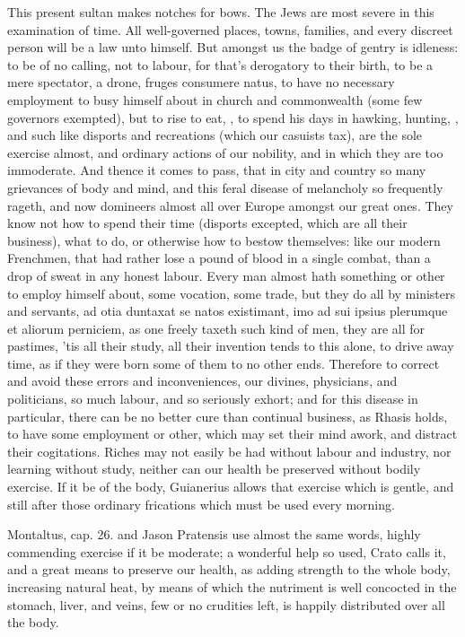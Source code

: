 {This present sultan makes notches for bows. The Jews are most
severe in this examination of time. All well-governed places, towns,
families, and every discreet person will be a law unto himself. But
amongst us the badge of gentry is idleness: to be of no calling, not to
labour, for that's derogatory to their birth, to be a mere spectator, a
drone, fruges consumere natus, to have no necessary employment to busy
himself about in church and commonwealth (some few governors exempted),
but to rise to eat, \etc{}, to spend his days in hawking, hunting, \etc{},
and such like disports and recreations (which our casuists tax),
are the sole exercise almost, and ordinary actions of our nobility, and
in which they are too immoderate. And thence it comes to pass, that in
city and country so many grievances of body and mind, and this feral
disease of melancholy so frequently rageth, and now domineers almost
all over Europe amongst our great ones. They know not how to spend
their time (disports excepted, which are all their business), what to
do, or otherwise how to bestow themselves: like our modern Frenchmen,
that had rather lose a pound of blood in a single combat, than a drop
of sweat in any honest labour. Every man almost hath something or other
to employ himself about, some vocation, some trade, but they do all by
ministers and servants, ad otia duntaxat se natos existimant, imo ad
sui ipsius plerumque et aliorum perniciem, as one freely taxeth
such kind of men, they are all for pastimes, 'tis all their study, all
their invention tends to this alone, to drive away time, as if they
were born some of them to no other ends. Therefore to correct and avoid
these errors and inconveniences, our divines, physicians, and
politicians, so much labour, and so seriously exhort; and for this
disease in particular, there can be no better cure than continual
business, as Rhasis holds, to have some employment or other, which may
set their mind awork, and distract their cogitations. Riches may not
easily be had without labour and industry, nor learning without study,
neither can our health be preserved without bodily exercise. If it be
of the body, Guianerius allows that exercise which is gentle, and
still after those ordinary frications which must be used every morning.

Montaltus, cap. 26. and Jason Pratensis use almost the same words,
highly commending exercise if it be moderate; a wonderful help so used,
Crato calls it, and a great means to preserve our health, as adding
strength to the whole body, increasing natural heat, by means of which
the nutriment is well concocted in the stomach, liver, and veins, few
or no crudities left, is happily distributed over all the body.

}
